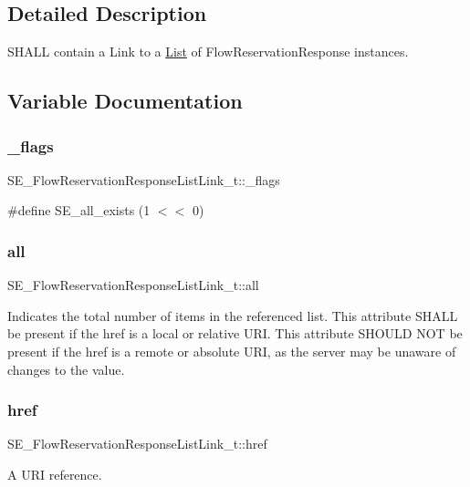 \subsection{Detailed Description}
S\+H\+A\+LL contain a Link to a \hyperlink{structList}{List} of Flow\+Reservation\+Response instances. 

\subsection{Variable Documentation}
\mbox{\label{group__FlowReservationResponseListLink_ga472e40613d38ed956c259f385ad4c968}} 
\subsubsection{\texorpdfstring{\+\_\+flags}{\_flags}}
{\footnotesize\ttfamily S\+E\+\_\+\+Flow\+Reservation\+Response\+List\+Link\+\_\+t\+::\+\_\+flags}

\#define S\+E\+\_\+all\+\_\+exists (1 $<$$<$ 0) \mbox{\label{group__FlowReservationResponseListLink_ga02d2763d5df8aaabc150972dee8b15f6}} 
\subsubsection{\texorpdfstring{all}{all}}
{\footnotesize\ttfamily S\+E\+\_\+\+Flow\+Reservation\+Response\+List\+Link\+\_\+t\+::all}

Indicates the total number of items in the referenced list. This attribute S\+H\+A\+LL be present if the href is a local or relative U\+RI. This attribute S\+H\+O\+U\+LD N\+OT be present if the href is a remote or absolute U\+RI, as the server may be unaware of changes to the value. \mbox{\label{group__FlowReservationResponseListLink_ga5b80e4ee833995e4a00a6a74745ffd7d}} 
\subsubsection{\texorpdfstring{href}{href}}
{\footnotesize\ttfamily S\+E\+\_\+\+Flow\+Reservation\+Response\+List\+Link\+\_\+t\+::href}

A U\+RI reference. 